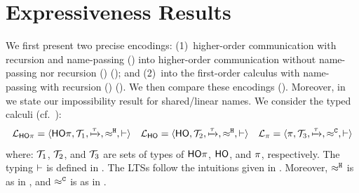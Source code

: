 \documentclass[runningheads]{llncs}
\begin{document}
{{\section{Expressiveness Results}
\label{sec:positive}
%
 We first present two %
 precise encodings: 
(1)~higher-order communication with recursion and name-passing   (\HOp) into 
higher-order communication without name-passing nor recursion (\HO) (); and 
(2)~\HOp into the first-order calculus with name-passing  
with recursion (\sessp) ().
We then compare these  encodings (). 
Moreover, in  we state our impossibility result for shared/linear names.
We consider the typed calculi (cf.~):
	$$\mathcal{L}_{\mathsf{HO}\pi}=\langle \mathsf{HO}\pi, {\cal{T}}_1, \xmapsto{\tau}, \approx^\mathtt{H}, \vdash \rangle
	\quad
	\mathcal{L}_{\mathsf{HO}}=\langle \mathsf{HO}, {\cal{T}}_2, \xmapsto{\tau}, \approx^\mathtt{H}, \vdash \rangle
	\quad
	\mathcal{L}_{\pi}=\langle \pi, {\cal{T}}_3, \xmapsto{\tau}, \approx^\mathtt{C}, \vdash \rangle$$
where: 
${\cal{T}}_1$, ${\cal{T}}_2$, 
and ${\cal{T}}_3$
are sets of types of $\mathsf{HO}\pi$, $\mathsf{HO}$, and $\pi$, respectively. 
The typing $\vdash$ is defined in 
.
The LTSs follow the intuitions given in .
Moreover, 
$\approx^\mathtt{H}$ is as in , and 
$\approx^\mathtt{C}$ is as in .


}}
\end{document}
